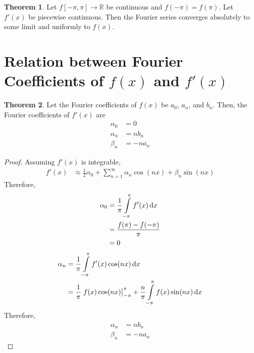 \documentclass[fleqn, a4paper, 12pt, twoside]{article}
\theoremstyle{definition}
\theoremstyle{theorem}
\newtheorem{theorem}{Theorem}
\begin{document}
\begin{theorem}
	Let $f[-\pi,\pi] \to \mathbb{R}$ be continuous and $f(-\pi) = f(\pi)$.
	Let $f'(x)$ be piecewise continuous.
	Then the Fourier series converges absolutely to some limit and uniformly to $f(x)$.
\end{theorem}

\section{Relation between Fourier Coefficients of $f(x)$ and $f'(x)$}

\begin{theorem}
	Let the Fourier coefficients of $f(x)$ be $a_0$, $a_n$, and $b_n$.
	Then, the Fourier coefficients of $f'(x)$ are
	\begin{align*}
		\alpha_0 &= 0\\
		\alpha_n &= n b_n\\
		\beta_n &= -n a_n
	\end{align*}
\end{theorem}

\begin{proof}
	Assuming $f'(x)$ is integrable,
	\begin{align*}
		f'(x) &\approx \frac{1}{2} \alpha_0 + \sum\limits_{n = 1}^{\infty} \alpha_n \cos(n x) + \beta_n \sin(n x)
	\end{align*}
	Therefore,
	\begin{align*}
		\alpha_0 &= \frac{1}{\pi} \int\limits_{-\pi}^{\pi} f'(x) \dif x\\
		&= \frac{f(\pi) - f(-\pi)}{\pi}\\
		&= 0
	\end{align*}
	\begin{align*}
		\alpha_n &= \frac{1}{\pi} \int\limits_{-\pi}^{\pi} f'(x) \cos(n x) \dif x\\
		&= \frac{1}{\pi} \left. f(x) \cos(n x) \right|_{-\pi}^{\pi} + \frac{n}{\pi} \int\limits_{-\pi}^{\pi} f(x) \sin(n x) \dif x
	\end{align*}
	Therefore,
	\begin{align*}
		\alpha_n &= n b_n\\
		\beta_n &= -n a_n
	\end{align*}
\end{proof}
\end{document}
